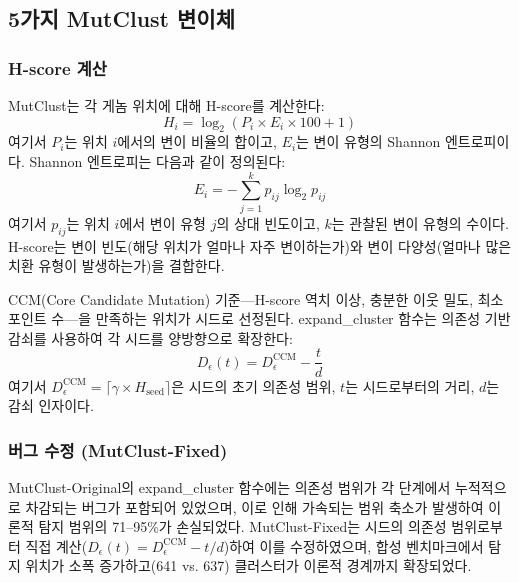 \subsection{5가지 MutClust 변이체}
\label{subsec:variants}

\subsubsection{H-score 계산}
\label{subsec:mutbench_hscore}

MutClust는 각 게놈 위치에 대해 H-score를 계산한다:
\begin{equation}
H_i = \log_2(P_i \times E_i \times 100 + 1)
\label{eq:mutbench_hscore}
\end{equation}
여기서 $P_i$는 위치 $i$에서의 변이 비율의 합이고, $E_i$는 변이 유형의 Shannon 엔트로피이다.
Shannon 엔트로피는 다음과 같이 정의된다:
\begin{equation}
E_i = -\sum_{j=1}^{k} p_{ij} \log_2 p_{ij}
\label{eq:shannon_entropy}
\end{equation}
여기서 $p_{ij}$는 위치 $i$에서 변이 유형 $j$의 상대 빈도이고, $k$는 관찰된 변이 유형의 수이다.
H-score는 변이 빈도(해당 위치가 얼마나 자주 변이하는가)와 변이 다양성(얼마나 많은 치환 유형이 발생하는가)을 결합한다.

CCM(Core Candidate Mutation) 기준---H-score 역치 이상, 충분한 이웃 밀도, 최소 포인트 수---을 만족하는 위치가 시드로 선정된다.
expand\_cluster 함수는 의존성 기반 감쇠를 사용하여 각 시드를 양방향으로 확장한다:
\begin{equation}
D_\epsilon(t) = D_\epsilon^{\text{CCM}} - \frac{t}{d}
\label{eq:expand_cluster}
\end{equation}
여기서 $D_\epsilon^{\text{CCM}} = \lceil \gamma \times H_{\text{seed}} \rceil$은 시드의 초기 의존성 범위, $t$는 시드로부터의 거리, $d$는 감쇠 인자이다.

\subsubsection{버그 수정 (MutClust-Fixed)}
\label{subsec:improvements}

MutClust-Original의 expand\_cluster 함수에는 의존성 범위가 각 단계에서 누적적으로 차감되는 버그가 포함되어 있었으며, 이로 인해 가속되는 범위 축소가 발생하여 이론적 탐지 범위의 71--95\%가 손실되었다.
MutClust-Fixed는 시드의 의존성 범위로부터 직접 계산($D_\epsilon(t) = D_\epsilon^{\text{CCM}} - t/d$)하여 이를 수정하였으며, 합성 벤치마크에서 탐지 위치가 소폭 증가하고(641 vs. 637) 클러스터가 이론적 경계까지 확장되었다.

